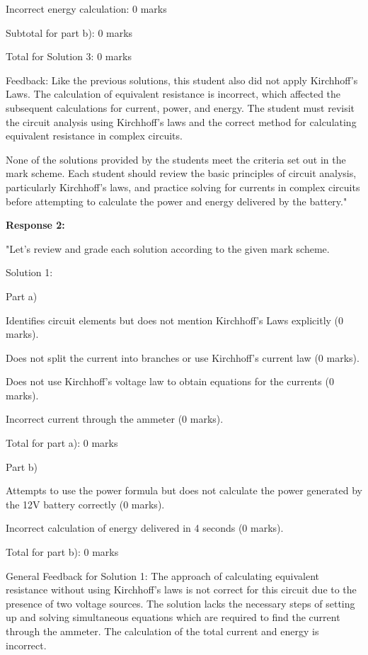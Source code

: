 \documentclass[a4paper,11pt]{article}
\begin{document}
Incorrect energy calculation: 0 marks

Subtotal for part b): 0 marks

Total for Solution 3: 0 marks

Feedback: Like the previous solutions, this student also did not apply Kirchhoff's Laws. The calculation of equivalent resistance is incorrect, which affected the subsequent calculations for current, power, and energy. The student must revisit the circuit analysis using Kirchhoff's laws and the correct method for calculating equivalent resistance in complex circuits.

None of the solutions provided by the students meet the criteria set out in the mark scheme. Each student should review the basic principles of circuit analysis, particularly Kirchhoff's laws, and practice solving for currents in complex circuits before attempting to calculate the power and energy delivered by the battery."

\textbf{Response 2:}

"Let's review and grade each solution according to the given mark scheme.

Solution 1:

Part a)

Identifies circuit elements but does not mention Kirchhoff's Laws explicitly (0 marks).

Does not split the current into branches or use Kirchhoff's current law (0 marks).

Does not use Kirchhoff's voltage law to obtain equations for the currents (0 marks).

Incorrect current through the ammeter (0 marks).

Total for part a): 0 marks

Part b)

Attempts to use the power formula but does not calculate the power generated by the 12V battery correctly (0 marks).

Incorrect calculation of energy delivered in 4 seconds (0 marks).

Total for part b): 0 marks

General Feedback for Solution 1:
The approach of calculating equivalent resistance without using Kirchhoff's laws is not correct for this circuit due to the presence of two voltage sources. The solution lacks the necessary steps of setting up and solving simultaneous equations which are required to find the current through the ammeter. The calculation of the total current and energy is incorrect.
\end{document}
